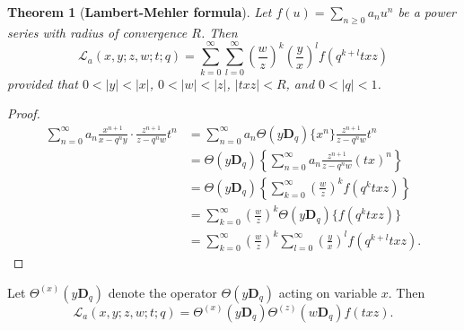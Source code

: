 \documentclass[12pt]{article}
\newcommand{\D}{\mathbf{D}}
\newcommand{\thp}{\Theta}
\newtheorem{theorem}{Theorem}
\begin{document}
\begin{theorem}[{\bf Lambert-Mehler formula}]\label{mehler}
Let \(f(u)=\sum_{n\ge0}a_nu^n\) be a power series with radius of convergence \(R\). Then 
    \begin{equation}
        \mathcal{L}_{a}(x,y;z,w;t;q)=\sum_{k=0}^{\infty}\sum_{l=0}^{\infty}\left(\frac{w}{z}\right)^k\left(\frac{y}{x}\right)^lf(q^{k+l}txz)
    \end{equation}
provided that $0<\vert y\vert<\vert x\vert$, $0<\vert w\vert<\vert z\vert$, $\vert txz\vert<R$, and $0<\vert q\vert<1$.    
\end{theorem}
\begin{proof}
    \begin{align*}
        \sum_{n=0}^{\infty}a_{n}\frac{x^{n+1}}{x-q^ny}\cdot\frac{z^{n+1}}{z-q^nw}t^n&=\sum_{n=0}^{\infty}a_{n}\thp(y\D_{q})\{x^n\}\frac{z^{n+1}}{z-q^nw}t^n\\
        &=\thp(y\D_{q})\left\{\sum_{n=0}^{\infty}a_{n}\frac{z^{n+1}}{z-q^nw}(tx)^n\right\}\\
        &=\thp(y\D_{q})\left\{\sum_{k=0}^{\infty}\left(\frac{w}{z}\right)^kf(q^ktxz)\right\}\\
        &=\sum_{k=0}^{\infty}\left(\frac{w}{z}\right)^k\thp(y\D_{q})\{f(q^ktxz)\}\\
        &=\sum_{k=0}^{\infty}\left(\frac{w}{z}\right)^k\sum_{l=0}^{\infty}\left(\frac{y}{x}\right)^lf(q^{k+l}txz).
    \end{align*}
\end{proof}
Let $\thp^{(x)}(y\D_q)$ denote the operator $\thp(y\D_q)$ acting on variable $x$. Then
\begin{equation}
    \mathcal{L}_{a}(x,y;z,w;t;q)=\thp^{(x)}(y\D_q)\thp^{(z)}(w\D_q)f(txz).
\end{equation}
\end{document}
